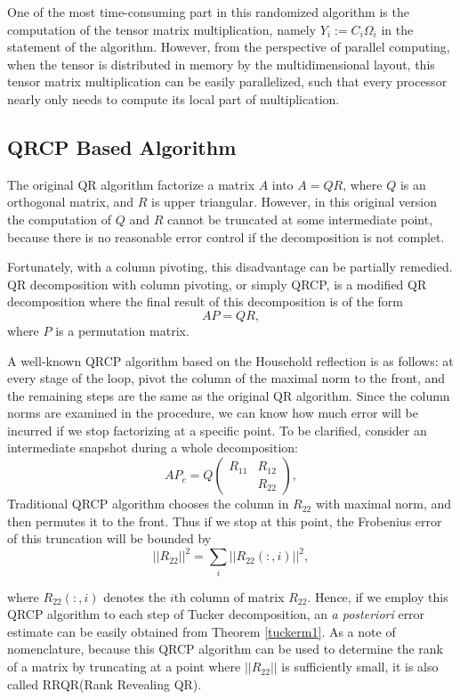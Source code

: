 \documentclass[12pt]{article}
\begin{document}
One of the most time-consuming part in this randomized algorithm is the computation of the tensor matrix multiplication, namely $Y_i := C_i \Omega_i$ in the statement of the algorithm. However, from the perspective of parallel computing, when the tensor is distributed in memory by the multidimensional layout, this tensor matrix multiplication can be easily parallelized, such that every processor nearly only needs to compute its local part of multiplication.

\subsection{QRCP Based Algorithm}

The original QR algorithm factorize a matrix $A$ into $A = QR$, where $Q$ is an orthogonal matrix, and $R$ is upper triangular. However, in this original version the computation of $Q$ and $R$ cannot be truncated at some intermediate point, because there is no reasonable error control if the decomposition is not complet. 

Fortunately, with a column pivoting, this disadvantage can be partially remedied. QR decomposition with column pivoting, or simply QRCP, is a modified QR decomposition where the final result of this decomposition is of the form
$$AP = QR,$$
where $P$ is a permutation matrix.

A well-known QRCP algorithm based on the Household reflection is as follows: at every stage of the loop, pivot the column of the maximal norm to the front, and the remaining steps are the same as the original QR algorithm. Since the column norms are examined in the procedure, we can know how much error will be incurred if we stop factorizing at a specific point. To be clarified, consider an intermediate snapshot during a whole decomposition:
$$
A P_c = Q
\begin{pmatrix}
R_{11} & R_{12}  \\
           & R_{22}
\end{pmatrix},
$$
Traditional QRCP algorithm chooses the column in $R_{22}$ with maximal norm, and then permutes it to the front. Thus if we stop at this point, the Frobenius error of this truncation will be bounded by 
$$ || R_{22} || ^2 = \sum_{i} || R_{22}(:,i) || ^2,$$

where $R_{22}(:,i)$ denotes the $i$th column of matrix $R_{22}$. Hence, if we employ this QRCP algorithm to each step of Tucker decomposition, an \textit{a posteriori} error estimate can be easily obtained from Theorem \ref{tuckerm1}. As a note of nomenclature, because this QRCP algorithm can be used to determine the rank of a matrix by truncating at a point where $||R_{22}||$ is sufficiently small, it is also called RRQR(Rank Revealing QR).
\end{document}
